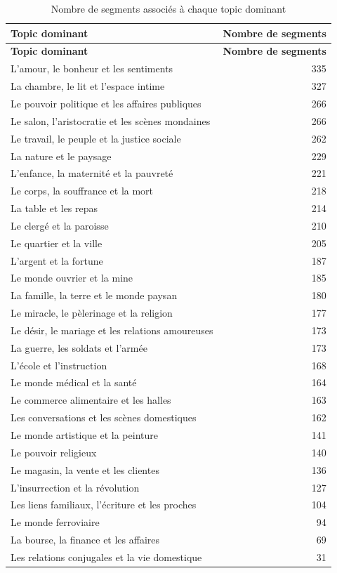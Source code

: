 \begin{longtable}{p{10cm}r}
\caption{Nombre de segments associés à chaque topic dominant} \\
\toprule
\textbf{Topic dominant} & \textbf{Nombre de segments} \\
\midrule
\endfirsthead

\toprule
\textbf{Topic dominant} & \textbf{Nombre de segments} \\
\midrule
\endhead

L'amour, le bonheur et les sentiments & 335 \\
La chambre, le lit et l'espace intime & 327 \\
Le pouvoir politique et les affaires publiques & 266 \\
Le salon, l'aristocratie et les scènes mondaines & 266 \\
Le travail, le peuple et la justice sociale & 262 \\
La nature et le paysage & 229 \\
L'enfance, la maternité et la pauvreté & 221 \\
Le corps, la souffrance et la mort & 218 \\
La table et les repas & 214 \\
Le clergé et la paroisse & 210 \\
Le quartier et la ville & 205 \\
L'argent et la fortune & 187 \\
Le monde ouvrier et la mine & 185 \\
La famille, la terre et le monde paysan & 180 \\
Le miracle, le pèlerinage et la religion & 177 \\
Le désir, le mariage et les relations amoureuses & 173 \\
La guerre, les soldats et l'armée & 173 \\
L'école et l'instruction & 168 \\
Le monde médical et la santé & 164 \\
Le commerce alimentaire et les halles & 163 \\
Les conversations et les scènes domestiques & 162 \\
Le monde artistique et la peinture & 141 \\
Le pouvoir religieux & 140 \\
Le magasin, la vente et les clientes & 136 \\
L'insurrection et la révolution & 127 \\
Les liens familiaux, l'écriture et les proches & 104 \\
Le monde ferroviaire & 94 \\
La bourse, la finance et les affaires & 69 \\
Les relations conjugales et la vie domestique & 31 \\

\bottomrule
\end{longtable}


